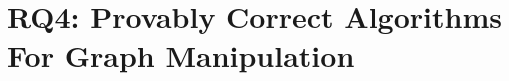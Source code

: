 \chapter{RQ4: Provably Correct Algorithms For Graph Manipulation}%
\label{chap:graph-manipulation}

